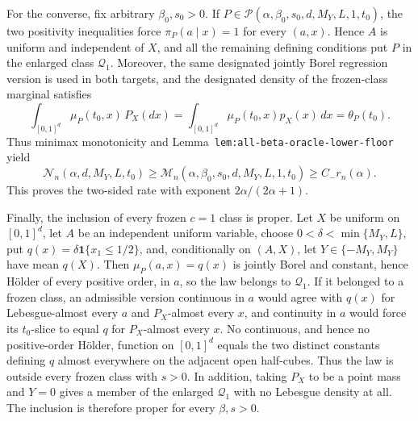 For the converse, fix arbitrary \(\beta_0,s_0>0\). If \(P\in\mathcal P(\alpha,\beta_0,s_0,d,M_Y,L,1,t_0)\), the two positivity inequalities force \(\pi_P(a\mid x)=1\) for every \((a,x)\). Hence \(A\) is uniform and independent of \(X\), and all the remaining defining conditions put \(P\) in the enlarged class \(\mathcal Q_1\). Moreover, the same designated jointly Borel regression version is used in both targets, and the designated density of the frozen-class marginal satisfies
\[
\int_{[0,1]^d}\mu_P(t_0,x)\,P_X(dx)
=
\int_{[0,1]^d}\mu_P(t_0,x)p_X(x)\,dx
=
\theta_P(t_0).
\]
Thus minimax monotonicity and Lemma~\texttt{lem:all-beta-oracle-lower-floor} yield
\[
\mathcal N_n(\alpha,d,M_Y,L,t_0)
\ge
\mathcal M_n(\alpha,\beta_0,s_0,d,M_Y,L,1,t_0)
\ge C_-r_n(\alpha).
\]
This proves the two-sided rate with exponent \(2\alpha/(2\alpha+1)\).

Finally, the inclusion of every frozen \(c=1\) class is proper. Let \(X\) be uniform on \([0,1]^d\), let \(A\) be an independent uniform variable, choose \(0<\delta<\min\{M_Y,L\}\), put \(q(x)=\delta\mathbf 1\{x_1\le1/2\}\), and, conditionally on \((A,X)\), let \(Y\in\{-M_Y,M_Y\}\) have mean \(q(X)\). Then \(\mu_P(a,x)=q(x)\) is jointly Borel and constant, hence H\"older of every positive order, in \(a\), so the law belongs to \(\mathcal Q_1\). If it belonged to a frozen class, an admissible version continuous in \(a\) would agree with \(q(x)\) for Lebesgue-almost every \(a\) and \(P_X\)-almost every \(x\), and continuity in \(a\) would force its \(t_0\)-slice to equal \(q\) for \(P_X\)-almost every \(x\). No continuous, and hence no positive-order H\"older, function on \([0,1]^d\) equals the two distinct constants defining \(q\) almost everywhere on the adjacent open half-cubes. Thus the law is outside every frozen class with \(s>0\). In addition, taking \(P_X\) to be a point mass and \(Y=0\) gives a member of the enlarged \(\mathcal Q_1\) with no Lebesgue density at all. The inclusion is therefore proper for every \(\beta,s>0\).